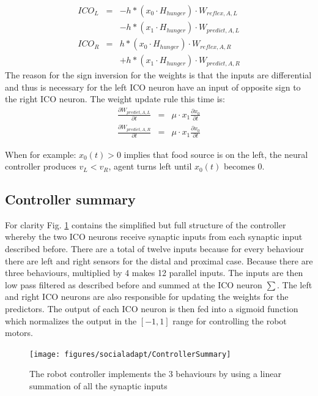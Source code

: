 \begin{eqnarray}
ICO_{L}&=&-h \ast ( x_0 \cdot H_{hunger}) \cdot W_{reflex,A,L} \\ \nonumber
       & &-h \ast ( x_1 \cdot H_{hunger}) \cdot W_{predict,A,L} \label{eq:ICO:L3}\\
ICO_{R}&=& h \ast ( x_0 \cdot H_{hunger}) \cdot W_{reflex,A,R} \\ \nonumber
       & &+h \ast ( x_1 \cdot H_{hunger}) \cdot W_{predict,A,R} \label{eq:ICO:R3}
\end{eqnarray}
The reason for the sign inversion for the weights is that the inputs
are differential and thus is necessary for the left ICO neuron have
an input of opposite sign to the right ICO neuron.
The weight update rule this time is:
\begin{eqnarray}
\frac{\partial W_{predict,A,L}}{\partial t}&=& \mu \cdot x_1 \frac{\partial x_0}{\partial t}\\
\frac{\partial W_{predict,A,R}}{\partial t}&=& \mu \cdot x_1 \frac{\partial x_0}{\partial t}
\end{eqnarray}

When for example: $x_{0}(t)>0$ implies that food source is on the left, the neural
controller produces $v_{L}<v_{R}$, agent turns left until $x_{0}(t)$ becomes 0.

\subsection{Controller summary}
For clarity Fig. \ref{fig:controllerSummary} contains the simplified but full structure of the controller whereby the two
ICO neurons receive synaptic inputs from each synaptic input described before.
There are a total of twelve inputs because for every behaviour there are left and
right sensors for the distal and proximal case.
Because there are three behaviours, multiplied by 4 makes 12 parallel inputs.
The inputs are then low pass filtered as described before and summed at the 
ICO neuron $\sum$.
The left and right ICO neurons are also responsible for updating the weights
for the predictors.
The output of each ICO neuron is then fed into a sigmoid function which normalizes
the output in the $[-1,1]$ range for controlling the robot motors.

\begin{figure}
\begin{center}
\texttt{[image: figures/socialadapt/ControllerSummary]}
\end{center}
\vspace*{4pt}
\caption[Full schematic of the controller]{
The robot controller implements the 3 behaviours by using a linear
summation of all the synaptic inputs \label{fig:controllerSummary}}
\end{figure}


